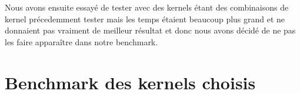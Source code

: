 \documentclass[fontsize=10pt, twoside=no]{scrartcl} %
\begin{document}
Nous avons ensuite essayé de tester avec des kernels étant des combinaisons de kernel précedemment tester mais les temps étaient beaucoup plus grand et ne donnaient pas vraiment de meilleur résultat et donc nous avons décidé de ne pas les faire apparaître dans notre benchmark.

\part{Benchmark des kernels choisis}

\\


\\
\end{document}

